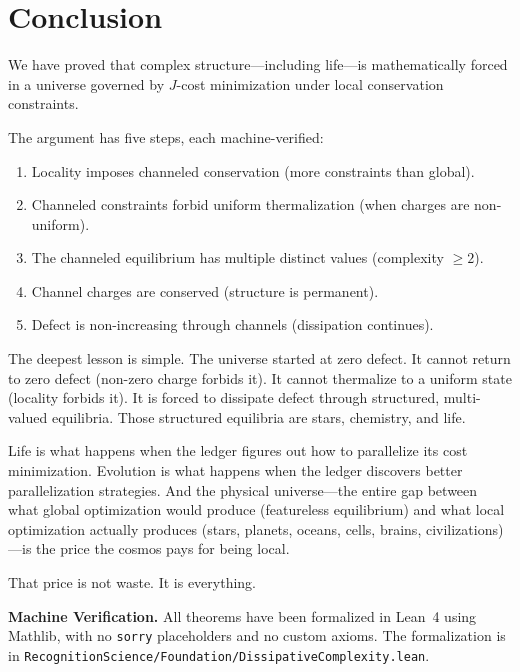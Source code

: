 \documentclass[11pt,a4paper]{article}
\theoremstyle{plain}
\theoremstyle{definition}
\theoremstyle{remark}
\newcommand{\Jcost}{J}
\begin{document}
\section{Conclusion}\label{sec:conclusion}

We have proved that complex structure---including life---is mathematically forced in a universe governed by $\Jcost$-cost minimization under local conservation constraints.

The argument has five steps, each machine-verified:
\begin{enumerate}[nosep]
\item Locality imposes channeled conservation (more constraints than global).
\item Channeled constraints forbid uniform thermalization (when charges are non-uniform).
\item The channeled equilibrium has multiple distinct values (complexity $\ge 2$).
\item Channel charges are conserved (structure is permanent).
\item Defect is non-increasing through channels (dissipation continues).
\end{enumerate}

The deepest lesson is simple.
The universe started at zero defect.
It cannot return to zero defect (non-zero charge forbids it).
It cannot thermalize to a uniform state (locality forbids it).
It is forced to dissipate defect through structured, multi-valued equilibria.
Those structured equilibria are stars, chemistry, and life.

Life is what happens when the ledger figures out how to parallelize its cost minimization.
Evolution is what happens when the ledger discovers better parallelization strategies.
And the physical universe---the entire gap between what global optimization would produce (featureless equilibrium) and what local optimization actually produces (stars, planets, oceans, cells, brains, civilizations)---is the price the cosmos pays for being local.

That price is not waste.
It is everything.

\bigskip

\noindent\textbf{Machine Verification.}\quad
All theorems have been formalized in Lean~4 using Mathlib, with no \texttt{sorry} placeholders and no custom axioms.
The formalization is in \texttt{RecognitionScience/Foundation/DissipativeComplexity.lean}.
\end{document}
